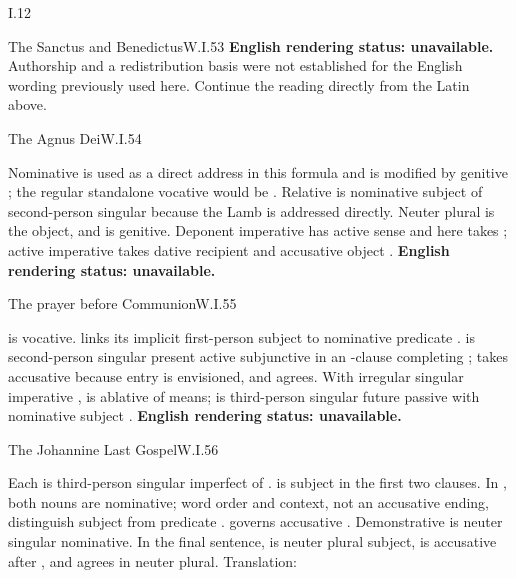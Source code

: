 \begin{courseunit}{I.12}
\begin{workedexample}{The Sanctus and Benedictus}{W.I.53}
\textbf{English rendering status: unavailable.} Authorship and a
redistribution basis were not established for the English wording previously
used here. Continue the reading directly from the Latin above.
\end{workedexample}

\begin{workedexample}{The Agnus Dei}{W.I.54}

Nominative  is used as a direct address in this formula and is
modified by genitive ; the regular standalone vocative would be
. Relative
 is nominative subject of second-person singular 
because the Lamb is addressed directly. Neuter plural  is the
object, and  is genitive. Deponent imperative 
has active sense and here takes ; active imperative 
takes dative recipient  and accusative object .
\textbf{English rendering status: unavailable.}
\end{workedexample}

\begin{workedexample}{The prayer before Communion}{W.I.55}

 is vocative.  links its implicit first-person
subject to nominative predicate .  is
second-person singular present active subjunctive in an -clause
completing ;
 takes accusative  because entry is envisioned, and
 agrees. With irregular singular imperative ,
 is ablative of means;  is third-person singular future
passive with nominative subject .
\textbf{English rendering status: unavailable.}
\end{workedexample}

\begin{workedexample}{The Johannine Last Gospel}{W.I.56}

Each  is third-person singular imperfect of .
 is subject in the first two clauses. In
, both nouns are nominative; word order and context,
not an accusative ending, distinguish subject  from predicate
.  governs accusative . Demonstrative
 is neuter singular nominative. In the final sentence,
 is neuter plural subject,  is accusative after
, and  agrees in neuter plural. Translation:
\end{workedexample}


\end{courseunit}
